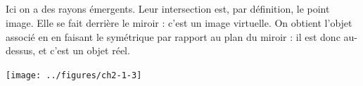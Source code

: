 \documentclass[../main/main.tex]{subfiles}
\begin{document}
\subsection{}
\begin{minipage}{0.75\linewidth}
    Ici on a des rayons émergents. Leur intersection est, par définition, le
    point image. Elle se fait derrière le miroir : c'est un image virtuelle. On
    obtient l'objet associé en en faisant le symétrique par rapport au plan du
    miroir : il est donc au-dessus, et c'est un objet réel.
\end{minipage}
\begin{minipage}{0.25\linewidth}
    \begin{flushright}
        \texttt{[image: ../figures/ch2-1-3]}
    \end{flushright}
\end{minipage}
\end{document}
